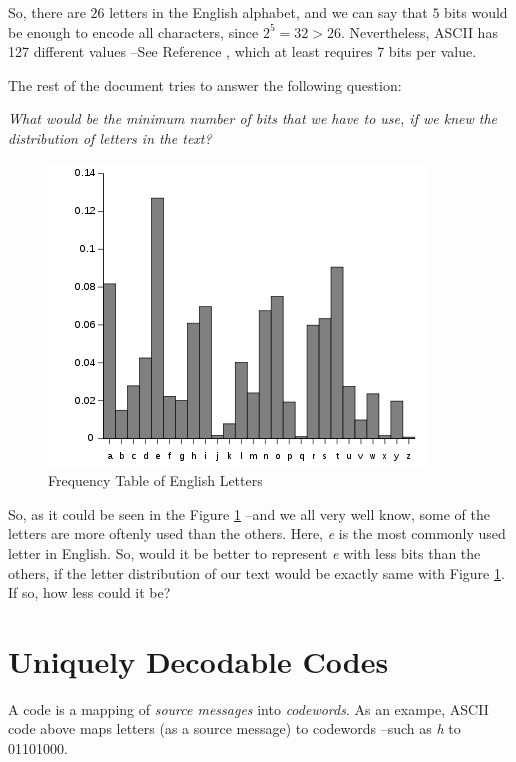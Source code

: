 \documentclass[11pt]{article}
\begin{document}
So, there are $26$ letters in the English alphabet, and we can say that $5$ bits would be enough to encode all characters, since $2^{5} = 32 > 26$. Nevertheless, ASCII has 127 different values --See Reference \cite{ascii}, which at least requires 7 bits per value. 

The rest of the document tries to answer the following question:

\begin{center}
\textit{What would be the minimum number of bits that we have to use, if we knew the distribution of letters in the text?}
\end{center}

\begin{figure}[ht!]
\centering
\includegraphics[width=\linewidth]{img/english_histogram.png}
\caption{Frequency Table of English Letters \label{fig:letter_histogram}}
\end{figure}

So, as it could be seen in the Figure \ref{fig:letter_histogram} --and we all very well know, some of the letters are more oftenly used than the others. Here, \textit{e} is the most commonly used letter in English. So, would it be better to represent \textit{e} with less bits than the others, if the letter distribution of our text would be exactly same with Figure \ref{fig:letter_histogram}. If so, how less could it be?

\section{Uniquely Decodable Codes}
A code is a mapping of \textit{source messages} into \textit{codewords}. As an exampe, ASCII code above maps letters (as a source message) to codewords --such as \textit{h} to 01101000. 
\end{document}
